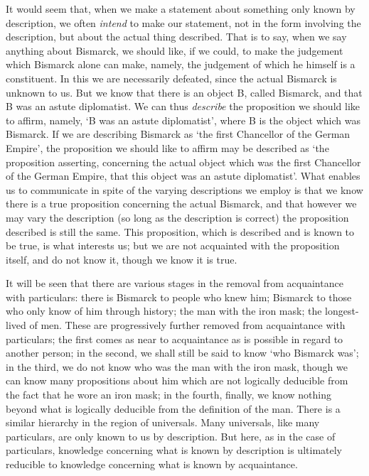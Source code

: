 \documentclass[oneside,letterpaper,12pt]{book}
\begin{document}
It would seem that, when we make a statement about something only known
by description, we often \emph{intend} to make our statement, not in the
form involving the description, but about the actual thing described.
That is to say, when we say anything about Bismarck, we should like, if
we could, to make the judgement which Bismarck alone can make, namely,
the judgement of which he himself is a constituent. In this we are
necessarily defeated, since the actual Bismarck is unknown to us. But we
know that there is an object B, called Bismarck, and that B was an
astute diplomatist. We can thus \emph{describe} the proposition we
should like to affirm, namely, `B was an astute
diplomatist', where B is the object which was Bismarck.
If we are describing Bismarck as `the first Chancellor
of the German Empire', the proposition we should like to
affirm may be described as `the proposition asserting,
concerning the actual object which was the first Chancellor of the
German Empire, that this object was an astute
diplomatist'. What enables us to communicate in spite of
the varying descriptions we employ is that we know there is a true
proposition concerning the actual Bismarck, and that however we may vary
the description (so long as the description is correct) the proposition
described is still the same. This proposition, which is described and is
known to be true, is what interests us; but we are not acquainted with
the proposition itself, and do not know it, though we know it is true.

It will be seen that there are various stages in the removal from
acquaintance with particulars: there is Bismarck to people who knew him;
Bismarck to those who only know of him through history; the man with the
iron mask; the longest-lived of men. These are progressively further
removed from acquaintance with particulars; the first comes as near to
acquaintance as is possible in regard to another person; in the second,
we shall still be said to know `who Bismarck
was'; in the third, we do not know who was the man with
the iron mask, though we can know many propositions about him which are
not logically deducible from the fact that he wore an iron mask; in the
fourth, finally, we know nothing beyond what is logically deducible from
the definition of the man. There is a similar hierarchy in the region of
universals. Many universals, like many particulars, are only known to us
by description. But here, as in the case of particulars, knowledge
concerning what is known by description is ultimately reducible to
knowledge concerning what is known by acquaintance.
\end{document}
